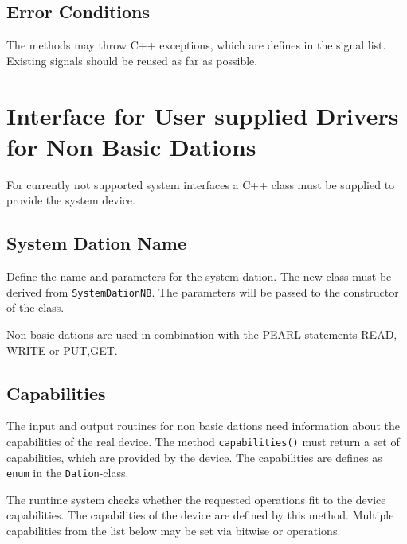 \subsection{Error Conditions}
The methods may throw C++ exceptions, which are defines in the signal list.
Existing signals should be reused as far as possible.

\section{Interface for User supplied Drivers for Non Basic Dations}
For currently not supported system interfaces a C++ class must be supplied to 
provide the system device.

\subsection{System Dation Name}
Define the name and parameters for the system dation.
The new class must be derived from \verb|SystemDationNB|.
The parameters will be passed to the constructor of the class.

Non basic dations are used in combination with the PEARL statements READ, WRITE
or PUT,GET. 

\subsection{Capabilities}
The input and output routines for non basic dations 
need information about the capabilities of the
real device. The method \verb|capabilities()| must return a set of
capabilities, which are provided by the device. The capabilities are
defines as \verb|enum| in the \verb|Dation|-class.

The runtime system checks whether the requested operations fit to the 
device capabilities. The capabilities of the device are defined by this
method. Multiple capabilities from the list below may be set via bitwise
or operations.

